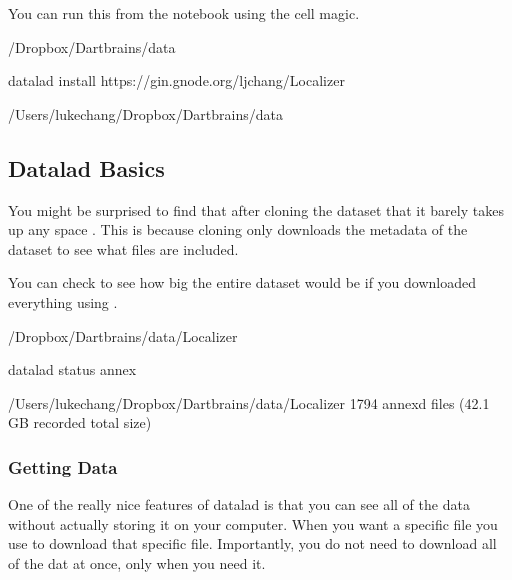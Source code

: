 \documentclass[letterpaper,10pt,english]{sphinxmanual}
\begin{document}
You can run this from the notebook using the \sphinxcode{\sphinxupquote{!}} cell magic.

\begin{sphinxVerbatim}[commandchars=\\\{\}]
 \PYGZti{}/Dropbox/Dartbrains/data

datalad install https://gin.g\PYGZhy{}node.org/ljchang/Localizer
\end{sphinxVerbatim}

\begin{sphinxVerbatim}[commandchars=\\\{\}]
/Users/lukechang/Dropbox/Dartbrains/data

\end{sphinxVerbatim}


\subsection{Datalad Basics}
\label{\detokenize{content/Download_Data:datalad-basics}}
You might be surprised to find that after cloning the dataset that it barely takes up any space . This is because cloning only downloads the metadata of the dataset to see what files are included.

You can check to see how big the entire dataset would be if you downloaded everything using .

\begin{sphinxVerbatim}[commandchars=\\\{\}]
 \PYGZti{}/Dropbox/Dartbrains/data/Localizer

datalad status \PYGZhy{}\PYGZhy{}annex
\end{sphinxVerbatim}

\begin{sphinxVerbatim}[commandchars=\\\{\}]
/Users/lukechang/Dropbox/Dartbrains/data/Localizer
1794 annex\PYGZsq{}d files (42.1 GB recorded total size)

\end{sphinxVerbatim}


\subsubsection{Getting Data}
\label{\detokenize{content/Download_Data:getting-data}}
One of the really nice features of datalad is that you can see all of the data without actually storing it on your computer. When you want a specific file you use  to download that specific file. Importantly, you do not need to download all of the dat at once, only when you need it.
\end{document}
